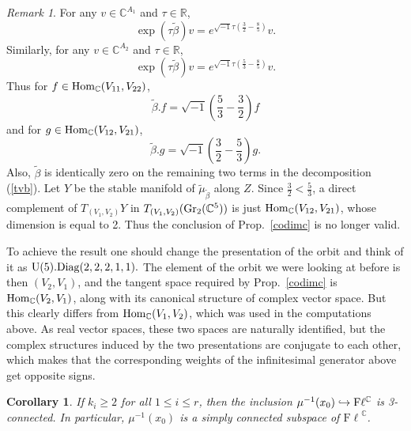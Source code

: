 \documentclass[12pt]{amsart}
\newtheorem{cor}[thm]{Corollary}
\theoremstyle{definition}
\theoremstyle{remark}
\newtheorem{rem}[thm]{Remark}
\newcommand{\RR}{\mathbb R}
\newcommand{\CC}{\mathbb C}
\newcommand{\Fl}{{\mathrm{F\ell}}}
\begin{document}
\begin{rem}
 For any $v\in \CC^{A_1}$ and $\tau \in \RR$,
   $$\exp(\tau \tilde{\beta}) v= e^{\sqrt{-1}\tau(\frac{3}{2}-\frac{8}{5})}v.$$
   Similarly, for any $v\in \CC^{A_2}$ and $\tau \in \RR$,
  $$\exp(\tau \tilde{\beta}) v= e^{\sqrt{-1}\tau(\frac{5}{3}-\frac{8}{5})}v.$$ 
  Thus for $f\in {\rm Hom}_\CC(V_{11}, V_{22})$,
  $$\tilde{\beta}.f= {\sqrt{-1}\left(\frac{5}{3}-\frac{3}{2}\right)}f$$
  and for $g\in {\rm Hom}_\CC(V_{12}, V_{21})$,
  $$\tilde{\beta}.g= {\sqrt{-1}\left(\frac{3}{2}-\frac{5}{3}\right)}g.$$
  Also, $\tilde{\beta}$ is identically zero on the remaining two terms in the decomposition (\ref{tvb}). 
  Let $Y$ be the stable manifold of $\tilde{\mu}_{\tilde{\beta}}$ along $Z$. Since $\frac{3}{2}<\frac{5}{3}$, a direct complement of $T_{(V_1, V_2)} Y$ in $T_{(V_1, V_2)}({\rm Gr}_2(\CC^5))$ is just 
  ${\rm Hom}_\CC(V_{12}, V_{21})$, whose dimension is equal to 2. Thus the conclusion of Prop.~\ref{codimc} is no longer valid.
  
  To achieve the result one should change the presentation  of the orbit and think of it as ${\rm U}(5).{\rm Diag}(2,2,2,1,1).$
 The element of the orbit we were looking at before is then $(V_2, V_1)$, and the  tangent space required by Prop.~\ref{codimc} is 
 ${\rm Hom}_\CC(V_2, V_1)$, along with its canonical structure of complex vector space.   But this clearly differs from ${\rm Hom}_\CC(V_1, V_2)$, which was used in the computations above. As real vector spaces, these two spaces are naturally identified, but the complex structures induced by the two presentations are conjugate to each other, which makes that the corresponding weights of the infinitesimal generator above get opposite signs.
   \end{rem}
 
\begin{cor}\label{levelconn} If $k_i \ge 2$ for all $1\le i \le r$, then the inclusion $\mu^{-1}(x_0)\hookrightarrow {\rm F}\ell^\CC$ is 3-connected.
In particular, $\mu^{-1}(x_0)$ is a simply connected  subspace of $\Fl^\CC$. 
\end{cor}
\end{document}
